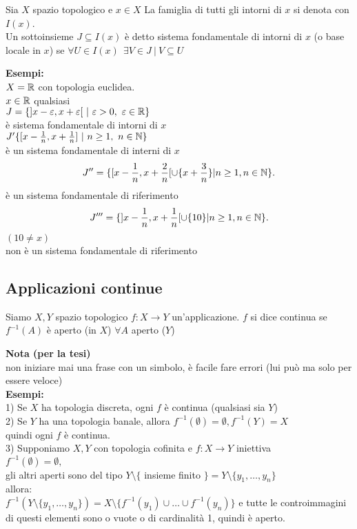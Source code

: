 \documentclass{article}
\begin{document}
	    \begin{defi}
	    	Sia $X$ spazio topologico e $x\in X$ La famiglia di tutti gli intorni di  $x$ si denota con $I(x)$.\\
		Un sottoinsieme $J\subseteq I(x)$ è detto sistema fondamentale di intorni di $x$ (o base locale in $x$) se $\forall U\in I(x)\ \  \exists V\in J \ |\ V\subseteq U $ 
	    \end{defi}
	    \textbf{Esempi:}\\
	    $X = \mathbb{R}$ con topologia euclidea.\\
	     $x\in\mathbb{R}$ qualsiasi\\
	     $J = \{]x - \varepsilon, x+ \varepsilon[ \ |\ \varepsilon > 0,  \ \varepsilon \in\R\} $\\
	     è sistema fondamentale di intorni di  $x$\\
	     $J'\{[x- \frac 1n, x + \frac 1n] \ | \ n\geq 1, \  n\in\mathbb{N}\}$ \\
	     è un sistema fondamentale di interni di $x$\\
	     \[
		      J''= \{[x-\frac 1n, x + \frac 2n[\cup \{x + \frac 3n \} | n\geq 1, n\in\mathbb{N}\}\\
	     .\] 
	     è un sistema fondamentale di riferimento
	      \[
		      J'''= \{]x-\frac 1n, x + \frac 1n[\cup \{10 \} | n\geq 1, n\in\mathbb{N}\}\\
	     .\] 
	     $(10\neq x)$\\
	     non è un sistema fondamentale di riferimento\\
	     \subsection{Applicazioni continue}
	     \begin{defi}
		     Siamo $X, Y$ spazio topologico $f : X \rightarrow Y$ un'applicazione. $f$ si dice continua se $f^{-1} (A)$ è aperto (in $X$) $\forall A$ aperto ($Y$)
	     \end{defi}
	     \textbf{Nota (per la tesi)}\\
	     non iniziare mai una frase con un simbolo, è facile fare errori  (lui può ma solo per essere veloce)\\
	     \textbf{Esempi:}\\
	     1) Se $X$ ha topologia discreta, ogni $f$ è continua (qualsiasi sia $Y$)\\
	     2) Se  $Y$ ha una topologia banale, allora $f^{-1}(\emptyset) =\emptyset, f^{-1}(Y) = X$\\
	     quindi ogni $f$ è continua.\\
	     3) Supponiamo $X,Y$ con topologia cofinita e $f:X \rightarrow Y$ iniettiva\\
	     $f^{-1}(\emptyset) = \emptyset, \ $\\
	     gli altri aperti sono del tipo $Y\setminus\{$ insieme finito  $\} = Y\setminus\{y_1,\ldots, y_n\}$\\
	     allora:\\
	     $f^{-1}(Y\setminus\{y_1,\ldots,y_n\}) = X\setminus\{f^{-1}(y_1)\cup\ldots\cup f^{-1}(y_n)\}$
	     e tutte le controimmagini di questi elementi sono o vuote o di cardinalità 1, quindi è aperto.
\end{document}
